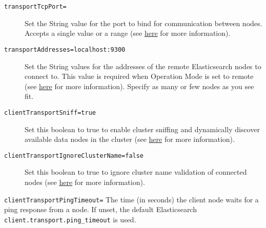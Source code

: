 \begin{description}
\item[\texttt{transportTcpPort=}]
Set the String value for the port to bind for communication between
nodes. Accepts a single value or a range (see
\href{https://www.elastic.co/guide/en/elasticsearch/reference/7.x/modules-transport.html\#_tcp_transport}{here}
for more information).
\item[\texttt{transportAddresses=localhost:9300}]
Set the String values for the addresses of the remote Elasticsearch
nodes to connect to. This value is required when Operation Mode is set
to remote (see
\href{https://www.elastic.co/guide/en/elasticsearch/client/java-api/7.x/transport-client.html}{here}
for more information). Specify as many or few nodes as you see fit.
\item[\texttt{clientTransportSniff=true}]
Set this boolean to true to enable cluster sniffing and dynamically
discover available data nodes in the cluster (see
\href{https://www.elastic.co/guide/en/elasticsearch/client/java-api/7.x/transport-client.html}{here}
for more information).
\item[\texttt{clientTransportIgnoreClusterName=false}]
Set this boolean to true to ignore cluster name validation of connected
nodes (see
\href{https://www.elastic.co/guide/en/elasticsearch/client/java-api/7.x/transport-client.html}{here}
for more information).
\end{description}

\texttt{clientTransportPingTimeout=} The time (in seconds) the client
node waits for a ping response from a node. If unset, the default
Elasticsearch \texttt{client.transport.ping\_timeout} is used.


